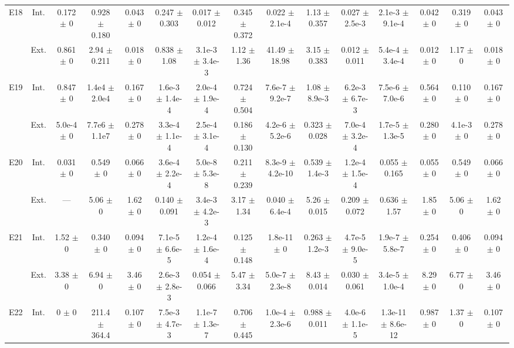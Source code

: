 \begin{table}[htbp]
{\begin{tabular}{@{}ccccccccccccccc@{}}
\cline{2-15}
\multirow{2}{*}{E18} & Int. & 0.172 $\pm$ 0 & 0.928 $\pm$ 0.180 & 0.043 $\pm$ 0 & 0.247 $\pm$ 0.303 & 0.017 $\pm$ 0.012 & 0.345 $\pm$ 0.372 & 0.022 $\pm$ 2.1e-4 & 1.13 $\pm$ 0.357 & 0.027 $\pm$ 2.5e-3 & 2.1e-3 $\pm$ 9.1e-4 & 0.042 $\pm$ 0 & 0.319 $\pm$ 0 & 0.043 $\pm$ 0 \\
 & Ext. & 0.861 $\pm$ 0 & 2.94 $\pm$ 0.211 & 0.018 $\pm$ 0 & 0.838 $\pm$ 1.08 & 3.1e-3 $\pm$ 3.4e-3 & 1.12 $\pm$ 1.36 & 41.49 $\pm$ 18.98 & 3.15 $\pm$ 0.383 & 0.012 $\pm$ 0.011 & 5.4e-4 $\pm$ 3.4e-4 & 0.012 $\pm$ 0 & 1.17 $\pm$ 0 & 0.018 $\pm$ 0 \\
\cline{2-15}
\multirow{2}{*}{E19} & Int. & 0.847 $\pm$ 0 & 1.4e4 $\pm$ 2.0e4 & 0.167 $\pm$ 0 & 1.6e-3 $\pm$ 1.4e-4 & 2.0e-4 $\pm$ 1.9e-4 & 0.724 $\pm$ 0.504 & 7.6e-7 $\pm$ 9.2e-7 & 1.08 $\pm$ 8.9e-3 & 6.2e-3 $\pm$ 6.7e-3 & 7.5e-6 $\pm$ 7.0e-6 & 0.564 $\pm$ 0 & 0.110 $\pm$ 0 & 0.167 $\pm$ 0 \\
 & Ext. & 5.0e-4 $\pm$ 0 & 7.7e6 $\pm$ 1.1e7 & 0.278 $\pm$ 0 & 3.3e-4 $\pm$ 1.1e-4 & 2.5e-4 $\pm$ 3.1e-4 & 0.186 $\pm$ 0.130 & 4.2e-6 $\pm$ 5.2e-6 & 0.323 $\pm$ 0.028 & 7.0e-4 $\pm$ 3.2e-4 & 1.7e-5 $\pm$ 1.3e-5 & 0.280 $\pm$ 0 & 4.1e-3 $\pm$ 0 & 0.278 $\pm$ 0 \\
\cline{2-15}
\multirow{2}{*}{E20} & Int. & 0.031 $\pm$ 0 & 0.549 $\pm$ 0 & 0.066 $\pm$ 0 & 3.6e-4 $\pm$ 2.2e-4 & 5.0e-8 $\pm$ 5.3e-8 & 0.211 $\pm$ 0.239 & 8.3e-9 $\pm$ 4.2e-10 & 0.539 $\pm$ 1.4e-3 & 1.2e-4 $\pm$ 1.5e-4 & 0.055 $\pm$ 0.165 & 0.055 $\pm$ 0 & 0.549 $\pm$ 0 & 0.066 $\pm$ 0 \\
 & Ext. & --- & 5.06 $\pm$ 0 & 1.62 $\pm$ 0 & 0.140 $\pm$ 0.091 & 3.4e-3 $\pm$ 4.2e-3 & 3.17 $\pm$ 1.34 & 0.040 $\pm$ 6.4e-4 & 5.26 $\pm$ 0.015 & 0.209 $\pm$ 0.072 & 0.636 $\pm$ 1.57 & 1.85 $\pm$ 0 & 5.06 $\pm$ 0 & 1.62 $\pm$ 0 \\
\cline{2-15}
\multirow{2}{*}{E21} & Int. & 1.52 $\pm$ 0 & 0.340 $\pm$ 0 & 0.094 $\pm$ 0 & 7.1e-5 $\pm$ 6.6e-5 & 1.2e-4 $\pm$ 1.6e-4 & 0.125 $\pm$ 0.148 & 1.8e-11 $\pm$ 0 & 0.263 $\pm$ 1.2e-3 & 4.7e-5 $\pm$ 9.0e-5 & 1.9e-7 $\pm$ 5.8e-7 & 0.254 $\pm$ 0 & 0.406 $\pm$ 0 & 0.094 $\pm$ 0 \\
 & Ext. & 3.38 $\pm$ 0 & 6.94 $\pm$ 0 & 3.46 $\pm$ 0 & 2.6e-3 $\pm$ 2.8e-3 & 0.054 $\pm$ 0.066 & 5.47 $\pm$ 3.34 & 5.0e-7 $\pm$ 2.3e-8 & 8.43 $\pm$ 0.014 & 0.030 $\pm$ 0.061 & 3.4e-5 $\pm$ 1.0e-4 & 8.29 $\pm$ 0 & 6.77 $\pm$ 0 & 3.46 $\pm$ 0 \\
\cline{2-15}
\multirow{2}{*}{E22} & Int. & 0 $\pm$ 0 & 211.4 $\pm$ 364.4 & 0.107 $\pm$ 0 & 7.5e-3 $\pm$ 4.7e-3 & 1.1e-7 $\pm$ 1.3e-7 & 0.706 $\pm$ 0.445 & 1.0e-4 $\pm$ 2.3e-6 & 0.988 $\pm$ 0.011 & 4.0e-6 $\pm$ 1.1e-5 & 1.3e-11 $\pm$ 8.6e-12 & 0.987 $\pm$ 0 & 1.37 $\pm$ 0 & 0.107 $\pm$ 0 \\

\end{tabular}}
\end{table}

